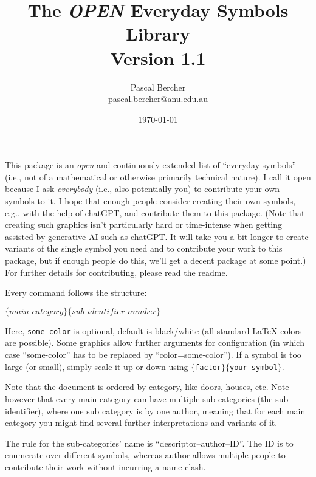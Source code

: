 \documentclass{article}
\begin{document}
\title{The \emph{OPEN} Everyday Symbols Library\\[1ex]\large Version 1.1}
\author{Pascal Bercher\\pascal.bercher@anu.edu.au}
\date{\today}

\maketitle

\setlength{\parindent}{0pt}

This package is an \emph{open} and continuously extended list of ``everyday symbols'' (i.e., not of a mathematical or otherwise primarily technical nature). I call it open because I ask \emph{everybody} (i.e., also potentially you) to contribute your own symbols to it. I hope that enough people consider creating their own symbols, e.g., with the help of chatGPT, and contribute them to this package. (Note that creating such graphics isn't particularly hard or time-intense when getting assisted by generative AI such as chatGPT. It will take you a bit longer to create variants of the single symbol you need and to contribute your work to this package, but if enough people do this, we'll get a decent package at some point.) For further details for contributing, please read the readme.

\medskip
Every command follows the structure:
\begin{center}
  \texttt{\string{}$\{\textit{main-category}\}\{\textit{sub-identifier-number}\}$}
\end{center}
Here, \texttt{some-color} is optional, default is black/white (all standard \LaTeX{} colors are possible). Some graphics allow further arguments for configuration (in which case ``some-color'' has to be replaced by ``color=some-color''). If a symbol is too large (or small), simply scale it up or down using
\texttt{\string\scalebox$\{$factor$\}\{$your-symbol$\}$}.

\medskip
Note that the document is ordered by category, like doors, houses, etc. Note however that every main category can have multiple sub categories (the sub-identifier), where one sub category is by one author, meaning that for each main category you might find several further interpretations and variants of it. 

\medskip
The rule for the sub-categories' name is ``descriptor--author--ID''. The ID is to enumerate over different symbols, whereas author allows multiple people to contribute their work without incurring a name clash.
\end{document}
